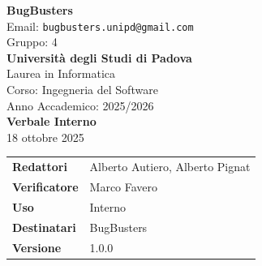 \documentclass[a4paper,12pt]{article}
\begin{document}
\begin{center}  
  
  {\Large\bfseries\color{primaryblue} BugBusters}\\[0.3cm]
  {\small\color{darkgray} Email: \texttt{bugbusters.unipd@gmail.com}} \\[0.1cm]
  {\small\color{darkgray} Gruppo: 4} \\[0.5cm]

  {\large\bfseries Università degli Studi di Padova}\\[0.3cm]
  {\small Laurea in Informatica}\\[0.2cm]
  {\small Corso: Ingegneria del Software}\\[0.2cm]
  {\small Anno Accademico: 2025/2026}\\[0.8cm]

  {\Huge\bfseries\color{primaryblue} Verbale Interno}\\[0.3cm]
  {\Large\color{secondaryblue} 18 ottobre 2025}\\[0.8cm]
\end{center}

\begin{center}
\begin{tcolorbox}[colback=lightgray,colframe=primaryblue,width=0.85\textwidth,arc=3mm,boxrule=0.5pt]
\begin{tabular}{@{}ll@{}}
\textbf{Redattori}    & Alberto Autiero, Alberto Pignat \\
\textbf{Verificatore}    &  Marco Favero \\
\textbf{Uso}          & Interno \\
\textbf{Destinatari}  & BugBusters \\
\textbf{Versione} & 1.0.0\\

\end{tabular}
\end{tcolorbox}
\end{center}
\end{document}
